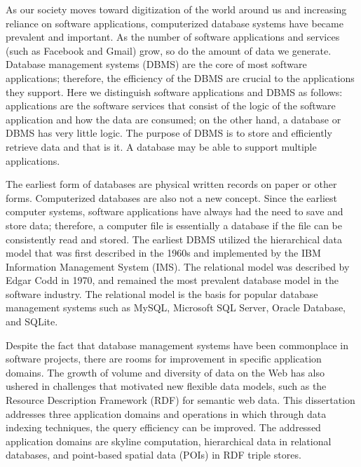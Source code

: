 As our society moves toward digitization of the world around us and increasing reliance on software applications, computerized database systems have became prevalent and important. As the number of software applications and services (such as Facebook and Gmail) grow, so do the amount of data we generate. Database management systems (DBMS) are the core of most software applications; therefore, the efficiency of the DBMS are crucial to the applications they support. Here we distinguish software applications and DBMS as follows: applications are the software services that consist of the logic of the software application and how the data are consumed; on the other hand, a database or DBMS has very little logic. The purpose of DBMS is to store and efficiently retrieve data and that is it. A database may be able to support multiple applications.

The earliest form of databases are physical written records on paper or other forms. Computerized databases are also not a new concept. Since the earliest computer systems, software applications have always had the need to save and store data; therefore, a computer file is essentially a database if the file can be consistently read and stored. The earliest DBMS utilized the hierarchical data model\cite{hdbms} that was first described in the 1960s and implemented by the IBM Information Management System (IMS)\cite{ims, intro_ims}. The relational model\cite{DBLP:journals/cacm/Codd70} was described by Edgar Codd in 1970, and remained the most prevalent database model in the software industry. The relational model is the basis for popular database management systems such as MySQL, Microsoft SQL Server, Oracle Database, and SQLite.

Despite the fact that database management systems have been commonplace in software projects, there are rooms for improvement in specific application domains. The growth of volume and diversity of data on the Web has also ushered in challenges that motivated new flexible data models, such as the Resource Description Framework (RDF) for semantic web data. This dissertation addresses three application domains and operations in which through data indexing techniques, the query efficiency can be improved. The addressed application domains are skyline computation, hierarchical data in relational databases, and point-based spatial data (POIs) in RDF triple stores.

